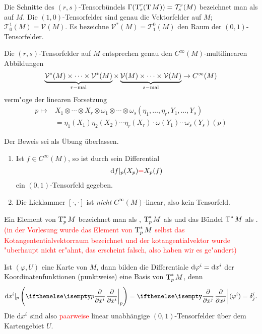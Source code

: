 Die Schnitte des $(r,s)$-Tensorbündels $\Gamma(\operatorname{T}_s^r(\operatorname{T} M)) = \mathcal T_s^r(M)$ bezeichnet man als  auf $M$. Die $(1,0)$-Tensorfelder sind genau die Vektorfelder auf $M$; $\mathcal T_0^1(M) = \mathcal V(M)$. Es bezeichne $\mathcal V^{*}(M) = \mathcal T_1^0(M)$ den Raum der $(0,1)$-Tensorfelder.

\begin{Prop}\label{prop-5-4}
Die $(r,s)$-Tensorfelder auf $M$ entsprechen genau den $C^{\infty}(M)$-multilinearen Abbildungen
	\[ \underbrace{\mathcal V^{*}(M) \times \cdots \times \mathcal V^{*}(M)}_{r-\text{mal}} \times \underbrace{\mathcal V(M) \times \cdots \times \mathcal V(M)}_{s-\text{mal}} \to C^{\infty}(M) \]
verm"oge der linearen Forsetzung
\begin{align*}
	p \mapsto & X_1 \otimes \cdots \otimes X_r \otimes \omega_1 \otimes \cdots \otimes \omega_s (\eta_1, \ldots, \eta_r, Y_1, \ldots, Y_s)\\
	& = \eta_1(X_1)\eta_2(X_2)\cdots\eta_r(X_r) \cdot \omega(Y_1)\cdots \omega_s(Y_s) (p)
\end{align*}
\end{Prop}

Der Beweis sei als Übung überlassen.

\begin{bsp}\begin{enumerate}[label=\arabic*)]
\item
	Ist $f \in C^{\infty}(M)$, so ist durch sein Differential
	\begin{align*}
		\mathrm{d} f|_p(X_p) \textcolor{red}{=} X_p(f)
	\end{align*}
	ein $(0,1)$-Tensorfeld gegeben.
\item
	Die Lieklammer $[\cdot,\cdot]$ ist \emph{nicht} $C^{\infty}(M)$-linear, also kein Tensorfeld.
\end{enumerate}\end{bsp}

Ein Element von $\operatorname{T}_p^*M$ bezeichnet man als , $\operatorname{T}_p^*M$ als  und das Bündel $\operatorname{T}^{*}M$ als . \textcolor{red}{(in der Vorlesung wurde das Element von $\operatorname{T}_p^*M$ selbst das Kotangententialvektorraum bezeichnet und der kotangentialvektor wurde "uberhaupt nicht er"ahnt, das erscheint falsch, also haben wir es ge"andert)}

Ist $(\varphi, U)$ eine Karte von $M$, dann bilden die Differentiale $\mathrm{d} \varphi^i = \mathrm{d} x^i$ der Koordinatenfunktionen (punktweise) eine Basis von $\operatorname{T}_p^{*}M$, denn
\begin{align*}
  \dop x^i|_p\left(\pdifffrac[p]{}{x^i}\right) = \pdifffrac{}{x^j}(\varphi^i) = \delta_j^i.
\end{align*}
Die $\mathrm{d} x^i$ sind also \textcolor{red}{paarweise} linear unabhängige $(0,1)$-Tensorfelder über dem Kartengebiet $U$.

